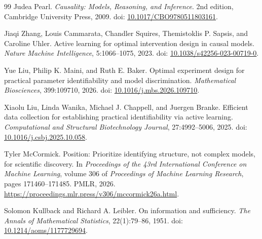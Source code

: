 \documentclass[11pt]{article}
\begin{document}
\begin{thebibliography}{99}
Judea Pearl.
\newblock \emph{Causality: Models, Reasoning, and Inference}.
\newblock 2nd edition, Cambridge University Press, 2009.
\newblock doi: \href{https://doi.org/10.1017/CBO9780511803161}{10.1017/CBO9780511803161}.

Jiaqi Zhang, Louis Cammarata, Chandler Squires, Themistoklis P. Sapsis, and Caroline Uhler.
\newblock Active learning for optimal intervention design in causal models.
\newblock \emph{Nature Machine Intelligence}, 5:1066--1075, 2023.
\newblock doi: \href{https://doi.org/10.1038/s42256-023-00719-0}{10.1038/s42256-023-00719-0}.

Yue Liu, Philip K. Maini, and Ruth E. Baker.
\newblock Optimal experiment design for practical parameter identifiability and model discrimination.
\newblock \emph{Mathematical Biosciences}, 399:109710, 2026.
\newblock doi: \href{https://doi.org/10.1016/j.mbs.2026.109710}{10.1016/j.mbs.2026.109710}.

Xiaolu Liu, Linda Wanika, Michael J. Chappell, and Juergen Branke.
\newblock Efficient data collection for establishing practical identifiability via active learning.
\newblock \emph{Computational and Structural Biotechnology Journal}, 27:4992--5006, 2025.
\newblock doi: \href{https://doi.org/10.1016/j.csbj.2025.10.058}{10.1016/j.csbj.2025.10.058}.

Tyler McCormick.
\newblock Position: Prioritize identifying structure, not complex models, for scientific discovery.
\newblock In \emph{Proceedings of the 43rd International Conference on Machine Learning}, volume 306 of \emph{Proceedings of Machine Learning Research}, pages 171460--171485. PMLR, 2026.
\newblock \url{https://proceedings.mlr.press/v306/mccormick26a.html}.

Solomon Kullback and Richard A. Leibler.
\newblock On information and sufficiency.
\newblock \emph{The Annals of Mathematical Statistics}, 22(1):79--86, 1951.
\newblock doi: \href{https://doi.org/10.1214/aoms/1177729694}{10.1214/aoms/1177729694}.
\end{thebibliography}
\end{document}
